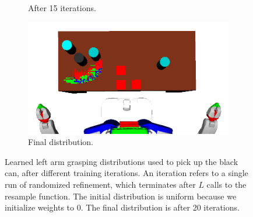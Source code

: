 \begin{figure}
\begin{subfigure}[b]{0.48\linewidth}
    \caption{After 15 iterations.}
  \end{subfigure}
  \begin{subfigure}[b]{0.48\linewidth}
    \includegraphics[width=\textwidth]{images/learng20.png}
    \caption{Final distribution.}
  \end{subfigure}
  \caption{Learned left arm grasping distributions used to
pick up the black can, after different training iterations.
An iteration refers to a single run of randomized refinement,
which terminates after $L$ calls to the resample function. The
initial distribution is uniform because we initialize weights to 0.
The final distribution is after 20 iterations.}
  \label{fig:training}
\end{figure}

